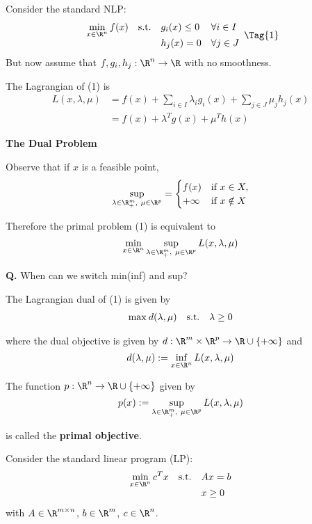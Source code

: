 
Consider the standard NLP:
\begin{equation*}
	\NlpStdForm\Tag{1}
\end{equation*}
But now assume that $f,g_i,h_j:\R^n\to\R$ with no smoothness.

The Lagrangian of (1) is
\begin{align*}
	L(x,\lambda,\mu)
	 & =f(x)+\sum_{i\in I}\lambda_ig_i(x) + \sum_{j\in J}\mu_jh_j(x) \\
	 & =f(x)+\lambda^Tg(x)+\mu^Th(x)
\end{align*}

\textbf{The Dual Problem}

Observe that if $x$ is a feasible point,
\begin{align*}
	\sup_{\lambda\in\R^m_+,\ \mu\in\R^p}=
	\begin{cases}
		f(x)    & \text{if }x\in X,   \\
		+\infty & \text{if }x\notin X
	\end{cases}
\end{align*}

%

Therefore the primal problem (1) is equivalent to
$$
	\min_{x\in\R^n}\sup_{\lambda\in\R^m_+,\ \mu\in\R^p}L(x,\lambda,\mu)
$$

\textbf{Q.} When can we switch min(inf) and sup?

\label{f6ab91b}

The Lagrangian dual of (1) is given by
$$
	\begin{array}{l l l l}
		\max_{}d(\lambda,\mu) & \text{s.t.} & \lambda\geq0
	\end{array}
$$

where the dual objective is given by
$d:\R^m\times\R^p\to\R\cup\{+\infty\}$ and
$$
	d(\lambda,\mu):=\inf_{x\in\R^n}L(x,\lambda,\mu)
$$

The function $p:\R^n\to\R\cup\{+\infty\}$ given by
$$
	p(x):=\sup_{\lambda\in\R^m_+,\ \mu\in\R^p}
	L(x,\lambda,\mu)
$$

is called the \textbf{primal objective}.

\label{ab8429b}

Consider the standard linear program (LP):
$$
	\begin{array}{l l l}
		\displaystyle \min_{x\in\R^n}c^Tx
		 & \text{s.t.} & Ax=b   \\
		 &             & x\geq0
	\end{array}
$$
with $A\in\R^{m\times n}$, $b\in\R^m$, $c\in\R^n$.

